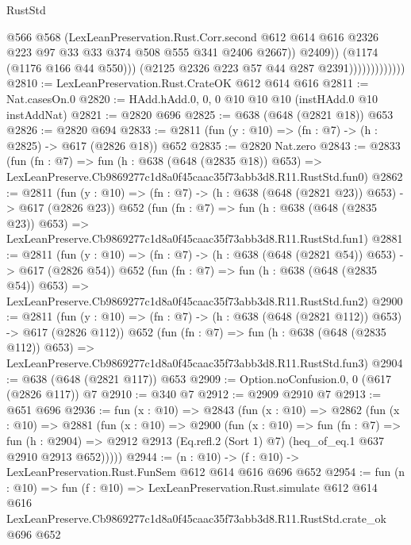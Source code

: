 \begin{lexlean}{RustStd}
\begin{coremodule}
                                    @566
                                    @568
                                    (LexLeanPreservation.Rust.Corr.second
                                      @612
                                      @614
                                      @616
                                      @2326
                                      @223
                                      @97
                                      @33
                                      @33
                                      @374
                                      @508
                                      @555
                                      @341
                                      @2406
                                      @2667))
                                  @2409))
                              (@1174 (@1176 @166 @44 @550)))
                            (@2125 @2326 @223 @57 @44 @287 @2391)))))))))))))
@2810 := LexLeanPreservation.Rust.CrateOK @612 @614 @616
@2811 := Nat.casesOn.{0}
@2820 := HAdd.hAdd.{0, 0, 0} @10 @10 @10 (instHAdd.{0} @10 instAddNat)
@2821 := @2820 @696
@2825 := @638 (@648 (@2821 @18)) @653
@2826 := @2820 @694
@2833 := @2811 (fun (y : @10) => (fn : @7) -> (h : @2825) -> @617 (@2826 @18)) @652
@2835 := @2820 Nat.zero
@2843 := @2833
    (fun (fn : @7) =>
    fun (h : @638 (@648 (@2835 @18)) @653) =>
    LexLeanPreserve.Cb9869277c1d8a0f45caac35f73abb3d8.R11.RustStd.fun0)
@2862 := @2811
    (fun (y : @10) => (fn : @7) -> (h : @638 (@648 (@2821 @23)) @653) -> @617 (@2826 @23))
    @652
    (fun (fn : @7) =>
    fun (h : @638 (@648 (@2835 @23)) @653) =>
    LexLeanPreserve.Cb9869277c1d8a0f45caac35f73abb3d8.R11.RustStd.fun1)
@2881 := @2811
    (fun (y : @10) => (fn : @7) -> (h : @638 (@648 (@2821 @54)) @653) -> @617 (@2826 @54))
    @652
    (fun (fn : @7) =>
    fun (h : @638 (@648 (@2835 @54)) @653) =>
    LexLeanPreserve.Cb9869277c1d8a0f45caac35f73abb3d8.R11.RustStd.fun2)
@2900 := @2811
    (fun (y : @10) => (fn : @7) -> (h : @638 (@648 (@2821 @112)) @653) -> @617 (@2826 @112))
    @652
    (fun (fn : @7) =>
    fun (h : @638 (@648 (@2835 @112)) @653) =>
    LexLeanPreserve.Cb9869277c1d8a0f45caac35f73abb3d8.R11.RustStd.fun3)
@2904 := @638 (@648 (@2821 @117)) @653
@2909 := Option.noConfusion.{0, 0} (@617 (@2826 @117)) @7
@2910 := @340 @7
@2912 := @2909 @2910 @7
@2913 := @651 @696
@2936 := fun (x : @10) =>
  @2843
    (fun (x : @10) =>
    @2862
      (fun (x : @10) =>
      @2881
        (fun (x : @10) =>
        @2900
          (fun (x : @10) =>
          fun (fn : @7) =>
          fun (h : @2904) =>
          @2912 @2913 (Eq.refl.{2} (Sort 1) @7) (heq_of_eq.{1} @637 @2910 @2913 @652)))))
@2944 := (n : @10) -> (f : @10) -> LexLeanPreservation.Rust.FunSem @612 @614 @616 @696 @652
@2954 := fun (n : @10) =>
  fun (f : @10) =>
  LexLeanPreservation.Rust.simulate
    @612
    @614
    @616
    LexLeanPreserve.Cb9869277c1d8a0f45caac35f73abb3d8.R11.RustStd.crate_ok
    @696
    @652
\end{coremodule}
\end{lexlean}
